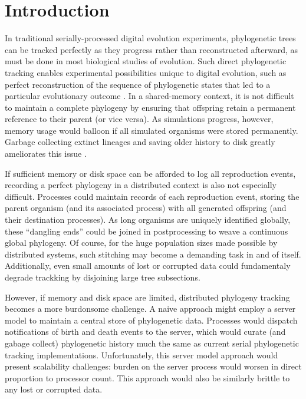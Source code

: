 \section{Introduction} \label{sec:introduction}

In traditional serially-processed digital evolution experiments, phylogenetic trees can be tracked perfectly as they progress \citep{bohm2017mabe,wang2018vine,lalejini2019data} rather than reconstructed afterward, as must be done in most biological studies of evolution.
Such direct phylogenetic tracking enables experimental possibilities unique to digital evolution, such as perfect reconstruction of the sequence of phylogenetic states that led to a particular evolutionary outcome \citep{lenski2003evolutionary, dolson2020interpreting}.
In a shared-memory context, it is not difficult to maintain a complete phylogeny by ensuring that offspring retain a permanent reference to their parent (or vice versa).
As simulations progress, however, memory usage would balloon if all simulated organisms were stored permanently.
Garbage collecting extinct lineages and saving older history to disk greatly ameliorates this issue \citep{bohm2017mabe,dolson2019modes}.

If sufficient memory or disk space can be afforded to log all reproduction events, recording a perfect phylogeny in a distributed context is also not especially difficult.
Processes could maintain records of each reproduction event, storing the parent organism (and its associated process) with all generated offspring (and their destination processes).
As long organisms are uniquely identified globally, these ``dangling ends'' could be joined in postprocessing to weave a continuous global phylogeny.
Of course, for the huge population sizes made possible by distributed systems, such stitching may become a demanding task in and of itself.
Additionally, even small amounts of lost or corrupted data could fundamentaly degrade trackking by disjoining large tree subsections.

However, if memory and disk space are limited, distributed phylogeny tracking becomes a more burdonsome challenge.
A naive approach might employ a server model to maintain a central store of phylogenetic data.
Processes would dispatch notifications of birth and death events to the server, which would curate (and gabage collect) phylogenetic history much the same as current serial phylogenetic tracking implementations.
Unfortunately, this server model approach would present scalability challenges: burden on the server process would worsen in direct proportion to processor count.
This approach would also be similarly brittle to any lost or corrupted data.

